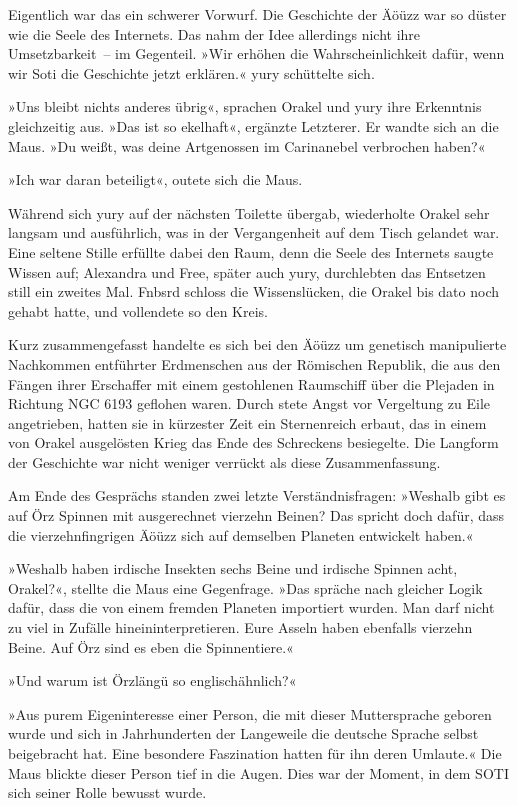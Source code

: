Eigentlich war das ein schwerer Vorwurf. Die Geschichte der Äöüzz war so düster wie die Seele des Internets. Das nahm der Idee allerdings nicht ihre Umsetzbarkeit~– im Gegenteil. »Wir erhöhen die Wahrscheinlichkeit dafür, wenn wir Soti die Geschichte jetzt erklären.« yury schüttelte sich.

»Uns bleibt nichts anderes übrig«, sprachen Orakel und yury ihre Erkenntnis gleichzeitig aus. »Das ist so ekelhaft«, ergänzte Letzterer. Er wandte sich an die Maus. »Du weißt, was deine Artgenossen im Carinanebel verbrochen haben?«

»Ich war daran beteiligt«, outete sich die Maus.

Während sich yury auf der nächsten Toilette übergab, wiederholte Orakel sehr langsam und ausführlich, was in der Vergangenheit auf dem Tisch gelandet war. Eine seltene Stille erfüllte dabei den Raum, denn die Seele des Internets saugte Wissen auf; Alexandra und Free, später auch yury, durchlebten das Entsetzen still ein zweites Mal. Fnbsrd schloss die Wissenslücken, die Orakel bis dato noch gehabt hatte, und vollendete so den Kreis.

Kurz zusammengefasst handelte es sich bei den Äöüzz um genetisch manipulierte Nachkommen entführter Erdmenschen aus der Römischen Republik, die aus den Fängen ihrer Erschaffer mit einem gestohlenen Raumschiff über die Plejaden in Richtung NGC 6193 geflohen waren. Durch stete Angst vor Vergeltung zu Eile angetrieben, hatten sie in kürzester Zeit ein Sternenreich erbaut, das in einem von Orakel ausgelösten Krieg das Ende des Schreckens besiegelte. Die Langform der Geschichte war nicht weniger verrückt als diese Zusammenfassung.

Am Ende des Gesprächs standen zwei letzte Verständnisfragen: »Weshalb gibt es auf Örz Spinnen mit ausgerechnet vierzehn Beinen? Das spricht doch dafür, dass die vierzehnfingrigen Äöüzz sich auf demselben Planeten entwickelt haben.«

»Weshalb haben irdische Insekten sechs Beine und irdische Spinnen acht, Orakel?«, stellte die Maus eine Gegenfrage. »Das spräche nach gleicher Logik dafür, dass die von einem fremden Planeten importiert wurden. Man darf nicht zu viel in Zufälle hineininterpretieren. Eure Asseln haben ebenfalls vierzehn Beine. Auf Örz sind es eben die Spinnentiere.«

»Und warum ist Örzlängü so englischähnlich?«

»Aus purem Eigeninteresse einer Person, die mit dieser Muttersprache geboren wurde und sich in Jahrhunderten der Langeweile die deutsche Sprache selbst beigebracht hat. Eine besondere Faszination hatten für ihn deren Umlaute.« Die Maus blickte dieser Person tief in die Augen. Dies war der Moment, in dem SOTI sich seiner Rolle bewusst wurde.

